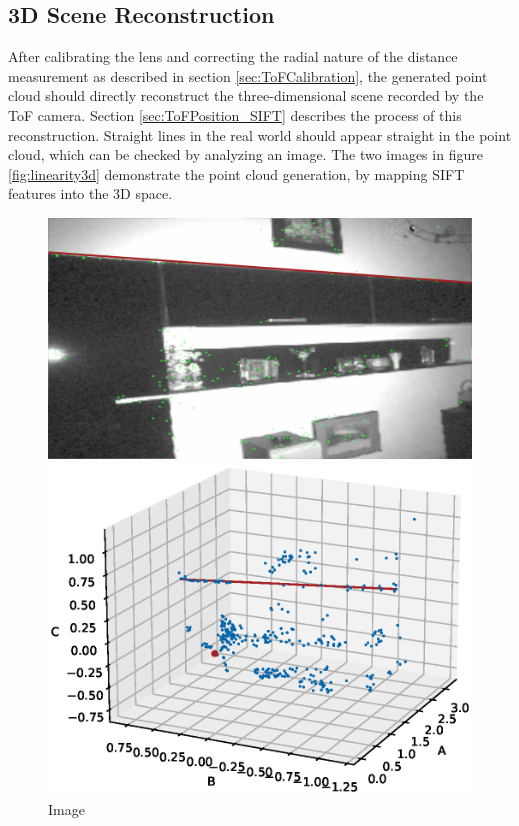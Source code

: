\subsection{3D Scene Reconstruction}
After calibrating the lens and correcting the radial nature of the distance measurement as described in section \ref{sec:ToFCalibration}, the generated point cloud should directly reconstruct the three-dimensional scene recorded by the ToF camera. Section \ref{sec:ToFPosition_SIFT} describes the process of this reconstruction.
Straight lines in the real world should appear straight in the point cloud, which can be checked by analyzing an image. The two images in figure \ref{fig:linearity3d} demonstrate the point cloud generation, by mapping SIFT features into the 3D space. 
\begin{figure}[H]
    \centering
    \begin{minipage}[b]{0.45\textwidth}
      \includegraphics[scale=0.105]{images/cloud_3d_linearity_image.png}
      \caption{Image}
      \label{fig:linearity3d_image} 
    \end{minipage} %
    \begin{minipage}[b]{0.45\textwidth}
      \includegraphics[scale=0.45, trim={0cm 0cm 2cm 3.5cm},clip]{images/linearity_3d.eps} 

\end{minipage}
\end{figure}
